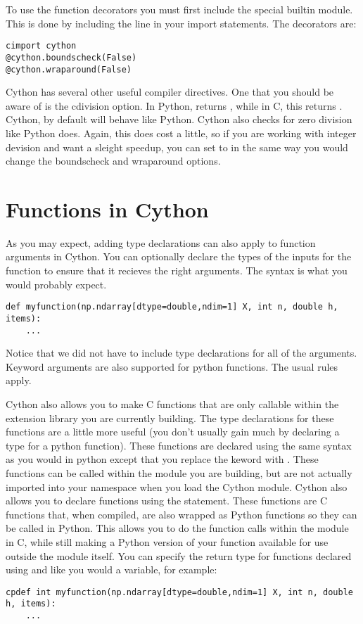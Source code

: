 To use the function decorators you must first include the special builtin  module.
This is done by including the line  in your import statements.
The decorators are:
\begin{lstlisting}
cimport cython
@cython.boundscheck(False)
@cython.wraparound(False)
\end{lstlisting}

Cython has several other useful compiler directives.
One that you should be aware of is the cdivision option.
In Python,  returns , while in C, this returns .
Cython, by default will behave like Python.
Cython also checks for zero division like Python does.
Again, this does cost a little, so if you are working with integer devision and want a sleight speedup, you can set  to  in the same way you would change the boundscheck and wraparound options.

\section*{Functions in Cython}

As you may expect, adding type declarations can also apply to function arguments in Cython.
You can optionally declare the types of the inputs for the function to ensure that it recieves the right arguments.
The syntax is what you would probably expect.
\begin{lstlisting}
def myfunction(np.ndarray[dtype=double,ndim=1] X, int n, double h, items):
	...
\end{lstlisting}

Notice that we did not have to include type declarations for all of the arguments.
Keyword arguments are also supported for python functions.
The usual rules apply.

Cython also allows you to make C functions that are only callable within the extension library you are currently building.
The type declarations for these functions are a little more useful (you don't usually gain much by declaring a type for a python function).
These functions are declared using the same syntax as you would in python except that you replace the keword  with .
These functions can be called within the module you are building, but are not actually imported into your namespace when you load the Cython module.
Cython also allows you to declare functions using the  statement.
These functions are C functions that, when compiled, are also wrapped as Python functions so they can be called in Python.
This allows you to do the function calls within the module in C, while still making a Python version of your function available for use outside the module itself.
You can specify the return type for functions declared using  and  like you would a variable, for example:
\begin{lstlisting}
cpdef int myfunction(np.ndarray[dtype=double,ndim=1] X, int n, double h, items):
	...
\end{lstlisting}

